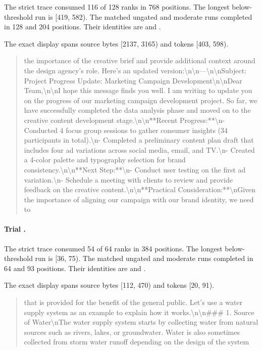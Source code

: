 The strict trace consumed 116 of 128 ranks in 768 positions. The longest below-threshold run is [419, 582). The matched ungated and moderate runs completed in 128 and 204 positions. Their identities are  and .

The exact display spans source bytes [2137, 3165) and tokens [403, 598).

\begin{quote}\small  the importance of the creative brief and provide additional context around the design agency's role. Here's an updated version:\textbackslash{}n\textbackslash{}n---\textbackslash{}n\textbackslash{}nSubject: Project Progress Update: Marketing Campaign Development\textbackslash{}n\textbackslash{}nDear Team,\textbackslash{}n\textbackslash{}nI hope this message finds you well. I am writing to update you on the progress of our marketing campaign development project. So far, we have successfully completed the data analysis phase and moved on to the creative content development stage.\textbackslash{}n\textbackslash{}n**Recent Progress:**\textbackslash{}n- Conducted 4 focus group sessions to gather consumer insights (34 participants in total).\textbackslash{}n- Completed a preliminary content plan draft that includes four ad variations across social media, email, and TV.\textbackslash{}n- Created a 4-color palette and typography selection for brand consistency.\textbackslash{}n\textbackslash{}n**Next Step:**\textbackslash{}n- Conduct user testing on the first ad variation.\textbackslash{}n- Schedule a meeting with clients to review and provide feedback on the creative content.\textbackslash{}n\textbackslash{}n**Practical Consideration:**\textbackslash{}nGiven the importance of aligning our campaign with our brand identity, we need to\end{quote}

\paragraph{Trial .}

The strict trace consumed 54 of 64 ranks in 384 positions. The longest below-threshold run is [36, 75). The matched ungated and moderate runs completed in 64 and 93 positions. Their identities are  and .

The exact display spans source bytes [112, 470) and tokens [20, 91).

\begin{quote}\small  that is provided for the benefit of the general public. Let's use a water supply system as an example to explain how it works.\textbackslash{}n\textbackslash{}n\#\#\# 1. Source of Water\textbackslash{}nThe water supply system starts by collecting water from natural sources such as rivers, lakes, or groundwater. Water is also sometimes collected from storm water runoff depending on the design of the system\end{quote}

